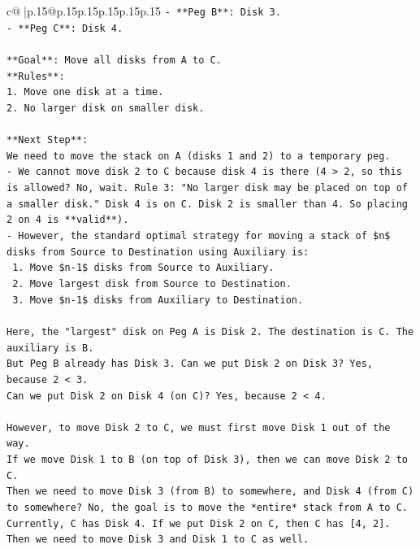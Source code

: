 \documentclass{article}
\begin{document}
{\begin{supertabular}{c@{$\;$}|p{.15\linewidth}@{}p{.15\linewidth}p{.15\linewidth}p{.15\linewidth}p{.15\linewidth}p{.15\linewidth}}
{{{\texttt{{-} **Peg B**: Disk 3.} \\
\texttt{{-} **Peg C**: Disk 4.} \\
\\ 
\texttt{**Goal**: Move all disks from A to C.} \\
\texttt{**Rules**:} \\
\texttt{1. Move one disk at a time.} \\
\texttt{2. No larger disk on smaller disk.} \\
\\ 
\texttt{**Next Step**:} \\
\texttt{We need to move the stack on A (disks 1 and 2) to a temporary peg.} \\
\texttt{{-} We cannot move disk 2 to C because disk 4 is there (4 > 2, so this is allowed? No, wait. Rule 3: "No larger disk may be placed on top of a smaller disk." Disk 4 is on C. Disk 2 is smaller than 4. So placing 2 on 4 is **valid**).} \\
\texttt{{-} However, the standard optimal strategy for moving a stack of \$n\$ disks from Source to Destination using Auxiliary is:} \\
\texttt{  1. Move \$n{-}1\$ disks from Source to Auxiliary.} \\
\texttt{  2. Move largest disk from Source to Destination.} \\
\texttt{  3. Move \$n{-}1\$ disks from Auxiliary to Destination.} \\
\\ 
\texttt{Here, the "largest" disk on Peg A is Disk 2. The destination is C. The auxiliary is B.} \\
\texttt{But Peg B already has Disk 3. Can we put Disk 2 on Disk 3? Yes, because 2 < 3.} \\
\texttt{Can we put Disk 2 on Disk 4 (on C)? Yes, because 2 < 4.} \\
\\ 
\texttt{However, to move Disk 2 to C, we must first move Disk 1 out of the way.} \\
\texttt{If we move Disk 1 to B (on top of Disk 3), then we can move Disk 2 to C.} \\
\texttt{Then we need to move Disk 3 (from B) to somewhere, and Disk 4 (from C) to somewhere? No, the goal is to move the *entire* stack from A to C.} \\
\texttt{Currently, C has Disk 4. If we put Disk 2 on C, then C has {[}4, 2{]}. Then we need to move Disk 3 and Disk 1 to C as well.} \\
}}}
\end{supertabular}}
\end{document}
